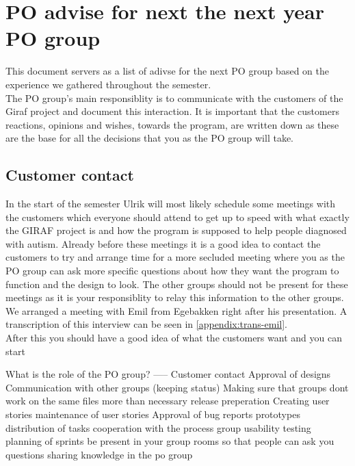 \section{PO advise for next the next year PO group} \label{appendix:PO-advise}
This document servers as a list of adivse for the next PO group based on the experience we gathered throughout the semester.
\\
The PO group's main responsiblity is to communicate with the customers of the Giraf project and document this interaction.
It is important that the customers reactions, opinions and wishes, towards the program, are written down as these are the base for all the decisions that you as the PO group will take.

\subsection{Customer contact}
In the start of the semester Ulrik will most likely schedule some meetings with the customers which everyone should attend to get up to speed with what exactly the GIRAF project is and how the program is supposed to help people diagnosed with autism.
Already before these meetings it is a good idea to contact the customers to try and arrange time for a more secluded meeting where you as the PO group can ask more specific questions about how they want the program to function and the design to look.
The other groups should not be present for these meetings as it is your responsiblity to relay this information to the other groups.
We arranged a meeting with Emil from Egebakken right after his presentation. 
A transcription of this interview can be seen in \autoref{appendix:trans-emil}.
\\
After this you should have a good idea of what the customers want and you can start 



What is the role of the PO group? -----
Customer contact
Approval of designs
Communication with other groups (keeping status)
Making sure that groups dont work on the same files more than necessary
release preperation
Creating user stories
maintenance of user stories
Approval of bug reports
prototypes
distribution of tasks
cooperation with the process group
usability testing
planning of sprints
be present in your group rooms so that people can ask you questions
sharing knowledge in the po group





